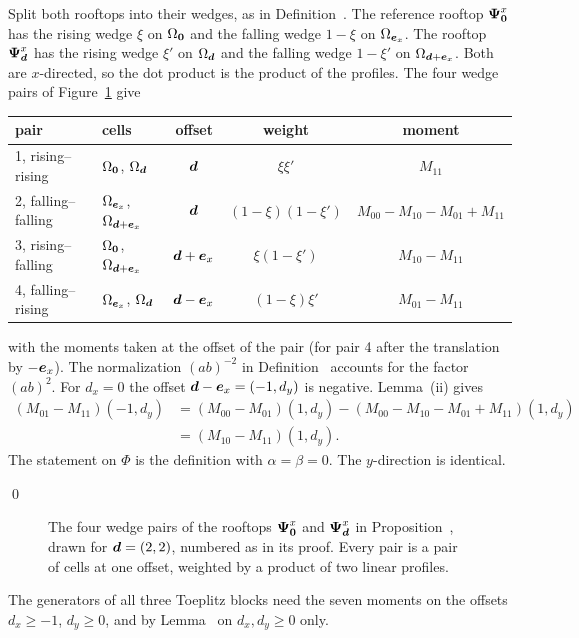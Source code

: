 \vspace{\baselineskip}
\proof
Split both rooftops into their wedges, as in Definition~. The reference rooftop $\vb*{\Psi}^x_{\vb*{0}}$ has the
rising wedge $\xi$ on $\Omega_{\vb*{0}}$ and the falling wedge $1-\xi$ on $\Omega_{\vb*{e}_x}$. The rooftop $\vb*{\Psi}^x_{\vb*{d}}$ has the
rising wedge $\xi'$ on $\Omega_{\vb*{d}}$ and the falling wedge $1-\xi'$ on $\Omega_{\vb*{d}+\vb*{e}_x}$. Both are $x$-directed, so the dot
product is the product of the profiles. The four wedge pairs of Figure~\ref{fig:wedgepairs} give
\begin{center}
    \renewcommand{\arraystretch}{1.25}
    \setlength{\tabcolsep}{5pt}
    \begin{tabular}{llccc}
        \toprule
        pair & cells & offset & weight & moment \\ \midrule
        1, rising--rising     & $\Omega_{\vb*{0}}$, $\Omega_{\vb*{d}}$     & $\vb*{d}$     & $\xi\xi'$           & $M_{11}$ \\
        2, falling--falling   & $\Omega_{\vb*{e}_x}$, $\Omega_{\vb*{d}+\vb*{e}_x}$   & $\vb*{d}$     & $(1-\xi)(1-\xi')$   & $M_{00}-M_{10}-M_{01}+M_{11}$ \\
        3, rising--falling    & $\Omega_{\vb*{0}}$, $\Omega_{\vb*{d}+\vb*{e}_x}$ & $\vb*{d}+\vb*{e}_x$ & $\xi(1-\xi')$       & $M_{10}-M_{11}$ \\
        4, falling--rising    & $\Omega_{\vb*{e}_x}$, $\Omega_{\vb*{d}}$       & $\vb*{d}-\vb*{e}_x$ & $(1-\xi)\xi'$       & $M_{01}-M_{11}$ \\ \bottomrule
    \end{tabular}
\end{center}
with the moments taken at the offset of the pair (for pair 4 after the translation by $-\vb*{e}_x$).
The normalization $(ab)^{-2}$ in Definition~ accounts for the factor $(ab)^2$. For $d_x=0$ the offset
$\vb*{d}-\vb*{e}_x=(-1,d_y)$ is negative. Lemma~(ii) gives
\begin{equation}
    \begin{aligned}
    (M_{01}-M_{11})(-1,d_y) &= (M_{00}-M_{01})(1,d_y)-(M_{00}-M_{10}-M_{01}+M_{11})(1,d_y)\\
                            &= (M_{10}-M_{11})(1,d_y).
    \end{aligned}
\end{equation}
The statement on $\Phi$ is the definition with $\alpha=\beta=0$. The $y$-direction is identical.

\qed

\begin{figure}[ht]
    \centering
    
    \caption{The four wedge pairs of the rooftops $\vb*{\Psi}^x_{\vb*{0}}$ and $\vb*{\Psi}^x_{\vb*{d}}$ in
    Proposition~, drawn for $\vb*{d}=(2,2)$, numbered as in its proof. Every pair is a pair of cells
    at one offset, weighted by a product of two linear profiles.}
    \label{fig:wedgepairs}
\end{figure}

\vspace{\baselineskip}
The generators of all three Toeplitz blocks need the seven moments on the offsets
$d_x\ge-1$, $d_y\ge0$, and by Lemma~ on $d_x,d_y\ge0$ only.
